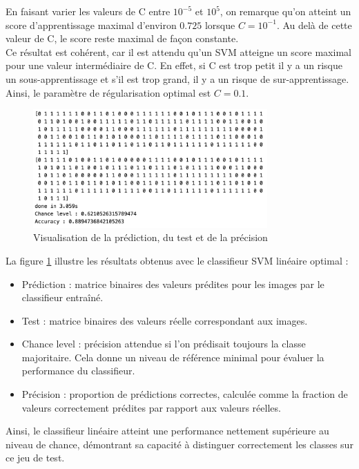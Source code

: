 \documentclass[a4paper,12pt]{article}
\begin{document}
En faisant varier les valeurs de C entre $10^{-5}$ et $10^{5}$, on remarque qu'on atteint un score d'apprentissage maximal d'environ $0.725$ lorsque $C=10^{-1}$.
Au delà de cette valeur de C, le score reste maximal de façon constante.\\
Ce résultat est cohérent, car il est attendu qu’un SVM atteigne un score maximal pour une valeur intermédiaire de 
C. En effet, si C est trop petit il y a un risque un sous-apprentissage et s'il est trop grand, il y a un risque de sur-apprentissage.\\
Ainsi, le paramètre de régularisation optimal est $C=0.1$.\\[0.5cm]


\begin{figure}[H]    
    \centering    
    \includegraphics[width=0.8\textwidth]{Images/label_prediction.png}
    \caption{Visualisation de la prédiction, du test et de la précision}\label{fig : precision}
\end{figure}

La figure \ref{fig : precision} illustre les résultats obtenus avec le classifieur SVM linéaire optimal : 
\begin{itemize}
    \item Prédiction : matrice binaires des valeurs prédites pour les images par le classifieur entraîné.
    \item Test : matrice binaires des valeurs réelle correspondant aux images.
    \item Chance level : précision attendue si l’on prédisait toujours la classe majoritaire. Cela donne un niveau de référence minimal pour évaluer la performance du classifieur.
    \item Précision : proportion de prédictions correctes, calculée comme la fraction de valeurs correctement prédites par rapport aux valeurs réelles.
\end{itemize}

Ainsi, le classifieur linéaire atteint une performance nettement supérieure au niveau de chance, démontrant sa capacité à distinguer correctement les classes sur ce jeu de test.
\end{document}
